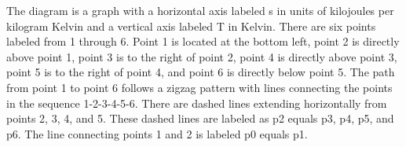 The diagram is a graph with a horizontal axis labeled s in units of kilojoules per kilogram Kelvin and a vertical axis labeled T in Kelvin. There are six points labeled from 1 through 6. Point 1 is located at the bottom left, point 2 is directly above point 1, point 3 is to the right of point 2, point 4 is directly above point 3, point 5 is to the right of point 4, and point 6 is directly below point 5. The path from point 1 to point 6 follows a zigzag pattern with lines connecting the points in the sequence 1-2-3-4-5-6. There are dashed lines extending horizontally from points 2, 3, 4, and 5. These dashed lines are labeled as p2 equals p3, p4, p5, and p6. The line connecting points 1 and 2 is labeled p0 equals p1.